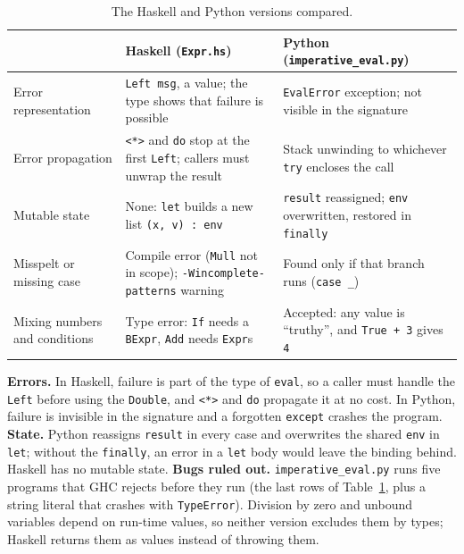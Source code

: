 \documentclass[12pt, a4paper]{report}
\newcommand{\code}[1]{\texttt{#1}}
\begin{document}
\begin{table}[tb]
\centering
\caption{The Haskell and Python versions compared.}
\label{tab:compare}
\footnotesize
\renewcommand{\arraystretch}{1.0}
\begin{tabularx}{\textwidth}{@{}>{\raggedright\arraybackslash}p{2.5cm}
    >{\raggedright\arraybackslash}X>{\raggedright\arraybackslash}X@{}}
\toprule
 & \textbf{Haskell (\code{Expr.hs})} & \textbf{Python (\code{imperative\_eval.py})} \\
\midrule
Error representation & \code{Left msg}, a value; the type shows that failure
  is possible & \code{EvalError} exception; not visible in the signature \\
Error propagation & \code{<*>} and \code{do} stop at the first \code{Left};
  callers must unwrap the result & Stack unwinding to whichever \code{try}
  encloses the call \\
Mutable state & None: \code{let} builds a new list \mbox{\code{(x, v) : env}} &
  \code{result} reassigned; \code{env} overwritten, restored in
  \code{finally} \\
Misspelt or missing case & Compile error (\code{Mull} not in scope);
  \code{-Wincomplete-patterns} warning & Found only if that
  branch runs (\code{case \_}) \\
Mixing numbers and conditions & Type error: \code{If} needs a \code{BExpr},
  \code{Add} needs \code{Expr}s & Accepted: any value is ``truthy'', and
  \code{True + 3} gives \code{4} \\
\bottomrule
\end{tabularx}
\end{table}

\textbf{Errors.} In Haskell, failure is part of the type of \code{eval}, so
a caller must handle the \code{Left} before using the \code{Double}, and
\code{<*>} and \code{do} propagate it at no cost. In Python, failure is
invisible in the signature and a forgotten \code{except} crashes the
program.
\textbf{State.} Python reassigns \code{result} in every case and overwrites the
shared \code{env} in \code{let}; without the \code{finally}, an error in a
\code{let} body would leave the binding behind. Haskell has no mutable state.
\textbf{Bugs ruled out.} \code{imperative\_eval.py} runs five programs that
GHC rejects before they run (the last rows of Table~\ref{tab:compare}, plus a
string literal that crashes with \code{TypeError}). Division by zero and
unbound variables depend on run-time values, so neither version excludes them
by types; Haskell returns them as values instead of throwing them.
\end{document}
